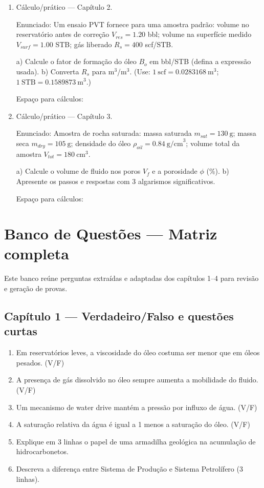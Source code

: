\documentclass[11pt,a4paper]{article}
\begin{document}
\begin{enumerate}
\vspace{6\baselineskip}

\item Cálculo/prático — Capítulo 2.

Enunciado: Um ensaio PVT fornece para uma amostra padrão: volume no reservatório antes de correção $V_{res}=1{.}20$ bbl; volume na superfície medido $V_{surf}=1{.}00$ STB; gás liberado $R_s=400$ scf/STB.

a) Calcule o fator de formação do óleo $B_o$ em bbl/STB (defina a expressão usada).  
b) Converta $R_s$ para m$^3$/m$^3$. (Use: $1\ \text{scf}=0{.}0283168\ \text{m}^3$; $1\ \text{STB}=0{.}1589873\ \text{m}^3$.)

Espaço para cálculos: \vspace{12\baselineskip}

\vspace{6mm}

\item Cálculo/prático — Capítulo 3.

Enunciado: Amostra de rocha saturada: massa saturada $m_{sat}=130\ \text{g}$; massa seca $m_{dry}=105\ \text{g}$; densidade do óleo $\rho_{oil}=0{.}84\ \text{g/cm}^3$; volume total da amostra $V_{tot}=180\ \text{cm}^3$.

a) Calcule o volume de fluido nos poros $V_f$ e a porosidade $\phi$ (\%).  
b) Apresente os passos e respostas com 3 algarismos significativos.

Espaço para cálculos: \vspace{12\baselineskip}

\end{enumerate}
\clearpage
\section{Banco de Questões — Matriz completa}
Este banco reúne perguntas extraídas e adaptadas dos capítulos 1–4 para revisão e geração de provas.

\subsection{Capítulo 1 — Verdadeiro/Falso e questões curtas}
\begin{enumerate}
\item Em reservatórios leves, a viscosidade do óleo costuma ser menor que em óleos pesados. (V/F)
\item A presença de gás dissolvido no óleo sempre aumenta a mobilidade do fluido. (V/F)
\item Um mecanismo de water drive mantém a pressão por influxo de água. (V/F)
\item A saturação relativa da água é igual a 1 menos a saturação do óleo. (V/F)
\item Explique em 3 linhas o papel de uma armadilha geológica na acumulação de hidrocarbonetos.
\item Descreva a diferença entre Sistema de Produção e Sistema Petrolífero (3 linhas).
\end{enumerate}
\end{document}
